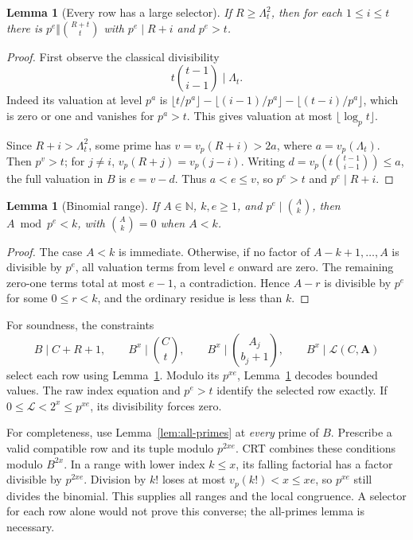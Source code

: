 \documentclass[11pt]{article}
\newtheorem{lemma}[theorem]{Lemma}
\theoremstyle{definition}
\newcommand{\N}{\mathbb N}
\newcommand{\LL}{\mathcal L}
\begin{document}
\begin{lemma}[Every row has a large selector]\label{lem:selector}
If $R\ge\Lambda_t^2$, then for each $1\le i\le t$ there is
$p^e\Vert\binom{R+t}{t}$ with $p^e\mid R+i$ and $p^e>t$.
\end{lemma}
\begin{proof}
First observe the classical divisibility
\[
t\binom{t-1}{i-1}\mid\Lambda_t.
\]
Indeed its valuation at level $p^a$ is
$\lfloor t/p^a\rfloor-\lfloor(i-1)/p^a\rfloor-
\lfloor(t-i)/p^a\rfloor$, which is zero or one and vanishes for
$p^a>t$. This gives valuation at most $\lfloor\log_p t\rfloor$.

Since $R+i>\Lambda_t^2$, some prime has
$v=v_p(R+i)>2a$, where $a=v_p(\Lambda_t)$. Then $p^v>t$;
for $j\ne i$, $v_p(R+j)=v_p(j-i)$. Writing
$d=v_p(t\binom{t-1}{i-1})\le a$, the full valuation in $B$ is
$e=v-d$. Thus $a<e\le v$, so $p^e>t$ and $p^e\mid R+i$.
\end{proof}

\begin{lemma}[Binomial range]\label{lem:range}
If $A\in\N$, $k,e\ge1$, and $p^e\mid\binom Ak$, then
$A\bmod p^e<k$, with $\binom Ak=0$ when $A<k$.
\end{lemma}
\begin{proof}
The case $A<k$ is immediate. Otherwise, if no factor of
$A-k+1,\ldots,A$ is divisible by $p^e$, all valuation terms from
level $e$ onward are zero. The remaining zero-one terms total at
most $e-1$, a contradiction. Hence $A-r$ is divisible by $p^e$
for some $0\le r<k$, and the ordinary residue is less than $k$.
\end{proof}

For soundness, the constraints
\[
B\mid C+R+1,\qquad B^x\mid\binom Ct,
\qquad B^x\mid\binom{A_j}{b_j+1},\qquad
B^x\mid\LL(C,\boldsymbol A)
\]
select each row using Lemma~\ref{lem:selector}. Modulo its
$p^{xe}$, Lemma~\ref{lem:range} decodes bounded values. The raw
index equation and $p^e>t$ identify the selected row exactly.
If $0\le\LL<2^x\le p^{xe}$, its divisibility forces zero.

For completeness, use Lemma~\ref{lem:all-primes} at \emph{every}
prime of $B$. Prescribe a valid compatible row and its tuple modulo
$p^{2xe}$. CRT combines these conditions modulo $B^{2x}$. In a range
with lower index $k\le x$, its falling factorial has a factor divisible
by $p^{2xe}$. Division by $k!$ loses at most $v_p(k!)<x\le xe$,
so $p^{xe}$ still divides the binomial. This supplies all ranges and
the local congruence. A selector for each row alone would not prove
this converse; the all-primes lemma is necessary.
\end{document}
